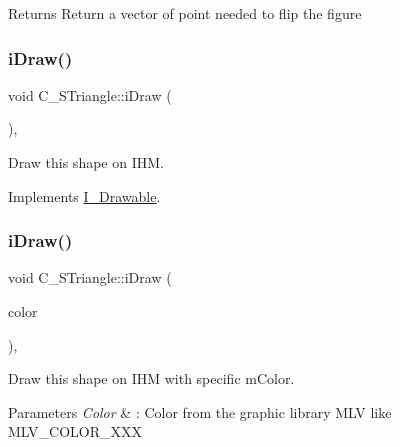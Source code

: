 \begin{DoxyReturn}{Returns}
Return a vector of point needed to flip the figure 
\end{DoxyReturn}
\mbox{\label{classC__STriangle_a7297480fe52b58654d81e2e70fbb237d}} 
\subsubsection{\texorpdfstring{i\+Draw()}{iDraw()}\hspace{0.1cm}{\footnotesize\ttfamily [1/2]}}
{\footnotesize\ttfamily void C\+\_\+\+S\+Triangle\+::i\+Draw (\begin{DoxyParamCaption}{ }\end{DoxyParamCaption})\hspace{0.3cm}{\ttfamily [override]}, {\ttfamily [virtual]}}



Draw this shape on I\+HM. 



Implements \hyperlink{classI__Drawable_ae24c65000977a805f52ce032321cd86f}{I\+\_\+\+Drawable}.

\mbox{\label{classC__STriangle_ad003b932a467de60b814d897fda38390}} 
\subsubsection{\texorpdfstring{i\+Draw()}{iDraw()}\hspace{0.1cm}{\footnotesize\ttfamily [2/2]}}
{\footnotesize\ttfamily void C\+\_\+\+S\+Triangle\+::i\+Draw (\begin{DoxyParamCaption}\item[{M\+L\+V\+\_\+\+Color}]{color }\end{DoxyParamCaption})\hspace{0.3cm}{\ttfamily [override]}, {\ttfamily [virtual]}}



Draw this shape on I\+HM with specific m\+Color. 


\begin{DoxyParams}{Parameters}
{\em Color} & \+: Color from the graphic library M\+LV like M\+L\+V\+\_\+\+C\+O\+L\+O\+R\+\_\+\+X\+XX \\
\hline
\end{DoxyParams}


